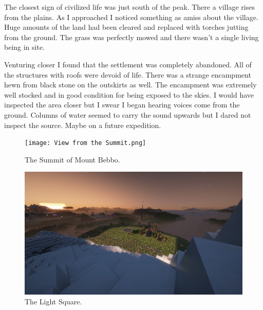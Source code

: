 The closest sign of civilized life was just south of the peak. There a village rises from the plains. As I approached I noticed something as amiss about the village. Huge amounts of the land had been cleared and replaced with torches jutting from the ground. The grass was perfectly mowed and there wasn't a single living being in site.

Venturing closer I found that the settlement was completely abandoned. All of the structures with roofs were devoid of life. There was a strange encampment hewn from black stone on the outskirts as well. The encampment was extremely well stocked and in good condition for being exposed to the skies. I would have inspected the area closer but I swear I began hearing voices come from the ground. Columns of water seemed to carry the sound upwards but I dared not inspect the source. Maybe on a future expedition.

\begin{figure}[H]
        \centering
        \texttt{[image: View from the Summit.png]}
        \caption{The Summit of Mount Bebbo.}
    
\end{figure}

\begin{figure}[H]
    \centering
    \includegraphics[width=1\linewidth]{The light square from on Mount Bebbo.png}
    \caption{The Light Square.}
\end{figure}

